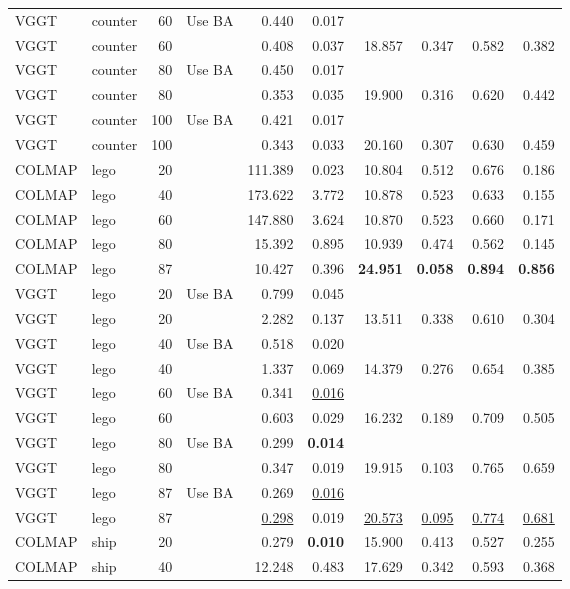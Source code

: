 \begin{table}[H]
\begin{tabular}{llrlrrrrrr}
VGGT & counter & 60 & Use BA & 0.440 & 0.017 &  &  &  &  \\
VGGT & counter & 60 &  & 0.408 & 0.037 & 18.857 & 0.347 & 0.582 & 0.382 \\
VGGT & counter & 80 & Use BA & 0.450 & 0.017 &  &  &  &  \\
VGGT & counter & 80 &  & 0.353 & 0.035 & 19.900 & 0.316 & 0.620 & 0.442 \\
VGGT & counter & 100 & Use BA & 0.421 & 0.017 &  &  &  &  \\
VGGT & counter & 100 &  & 0.343 & 0.033 & 20.160 & 0.307 & 0.630 & 0.459 \\
\midrule
COLMAP & lego & 20 &  & 111.389 & 0.023 & 10.804 & 0.512 & 0.676 & 0.186 \\
COLMAP & lego & 40 &  & 173.622 & 3.772 & 10.878 & 0.523 & 0.633 & 0.155 \\
COLMAP & lego & 60 &  & 147.880 & 3.624 & 10.870 & 0.523 & 0.660 & 0.171 \\
COLMAP & lego & 80 &  & 15.392 & 0.895 & 10.939 & 0.474 & 0.562 & 0.145 \\
COLMAP & lego & 87 &  & 10.427 & 0.396 & \textbf{24.951} & \textbf{0.058} & \textbf{0.894} & \textbf{0.856} \\
VGGT & lego & 20 & Use BA & 0.799 & 0.045 &  &  &  &  \\
VGGT & lego & 20 &  & 2.282 & 0.137 & 13.511 & 0.338 & 0.610 & 0.304 \\
VGGT & lego & 40 & Use BA & 0.518 & 0.020 &  &  &  &  \\
VGGT & lego & 40 &  & 1.337 & 0.069 & 14.379 & 0.276 & 0.654 & 0.385 \\
VGGT & lego & 60 & Use BA & 0.341 & \underline{0.016} &  &  &  &  \\
VGGT & lego & 60 &  & 0.603 & 0.029 & 16.232 & 0.189 & 0.709 & 0.505 \\
VGGT & lego & 80 & Use BA & 0.299 & \textbf{0.014} &  &  &  &  \\
VGGT & lego & 80 &  & 0.347 & 0.019 & 19.915 & 0.103 & 0.765 & 0.659 \\
VGGT & lego & 87 & Use BA & 0.269 & \underline{0.016} &  &  &  &  \\
VGGT & lego & 87 &  & \underline{0.298} & 0.019 & \underline{20.573} & \underline{0.095} & \underline{0.774} & \underline{0.681} \\
\midrule
COLMAP & ship & 20 &  & 0.279 & \textbf{0.010} & 15.900 & 0.413 & 0.527 & 0.255 \\
COLMAP & ship & 40 &  & 12.248 & 0.483 & 17.629 & 0.342 & 0.593 & 0.368 \\

\end{tabular}
\end{table}
